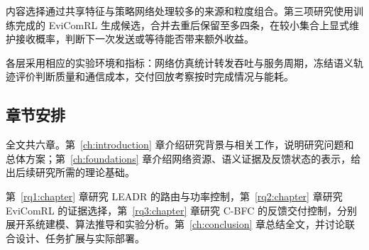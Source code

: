 \begin{figure}[htbp]
\centering

\label{fig:intro:framework}
\end{figure}

\FloatBarrier
内容选择通过共享特征与策略网络处理较多的来源和粒度组合。第三项研究使用训练完成的 EviComRL 生成候选，合并去重后保留至多四条，在较小集合上显式维护接收概率，判断下一次发送或等待能否带来额外收益。

各层采用相应的实验环境和指标：网络仿真统计转发吞吐与服务周期，冻结语义轨迹评价判断质量和通信成本，交付回放考察按时完成情况与能耗。

\subsection{章节安排}

全文共六章。第~\ref{ch:introduction} 章介绍研究背景与相关工作，说明研究问题和总体方案；第~\ref{ch:foundations} 章介绍网络资源、语义证据及反馈状态的表示，给出后续研究所需的理论基础。

第~\ref{rq1:chapter} 章研究 LEADR 的路由与功率控制，第~\ref{rq2:chapter} 章研究 EviComRL 的证据选择，第~\ref{rq3:chapter} 章研究 C-BFC 的反馈交付控制，分别展开系统建模、算法推导和实验分析。第~\ref{ch:conclusion} 章总结全文，并讨论联合设计、任务扩展与实际部署。
